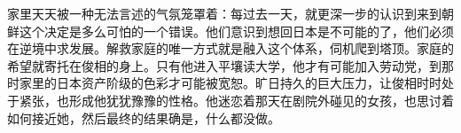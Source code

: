 \begin{multicols}{\theparacolNo}
家里天天被一种无法言述的气氛笼罩着：每过去一天，就更深一步的认识到来到朝鲜这个决定是多么可怕的一个错误。他们意识到想回日本是不可能的了，他们必须在逆境中求发展。解救家庭的唯一方式就是融入这个体系，伺机爬到塔顶。家庭的希望就寄托在俊相的身上。只有他进入平壤读大学，他才有可能加入劳动党，到那时家里的日本资产阶级的色彩才可能被宽恕。旷日持久的巨大压力，让俊相时时处于紧张，也形成他犹犹豫豫的性格。他迷恋着那天在剧院外碰见的女孩，也思讨着如何接近她，然后最终的结果确是，什么都没做。\\
\ifnum{}
	\end{multicols}
\fi